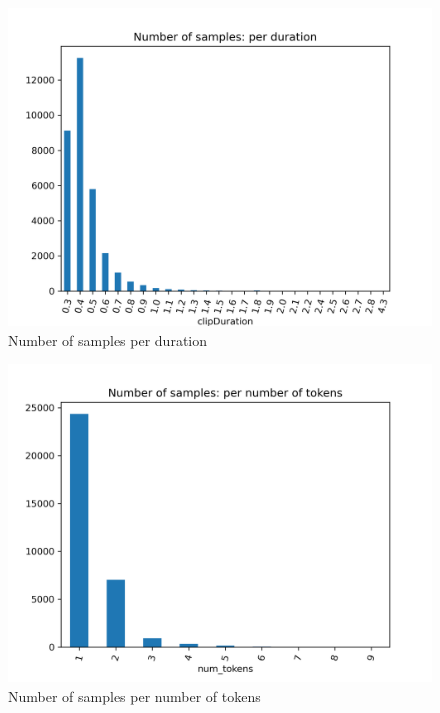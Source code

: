 \begin{figure}
  \centering
  \includegraphics[width=\textwidth]{results/targeted_triplets/num_samples_vs_duration.png}
  \caption{Number of samples per duration}
  \label{fig:num_samples_vs_duration}
\end{figure}


\begin{figure}
  \centering
  \includegraphics[width=\textwidth]{results/targeted_triplets/num_samples_vs_num_tokens.png}
  \caption{Number of samples per number of tokens}
  \label{fig:num_samples_vs_num_tokens}
\end{figure}

